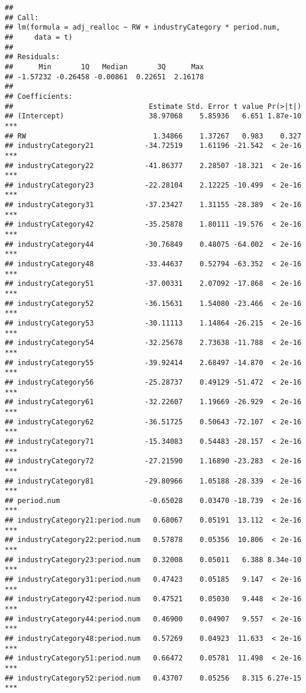 \documentclass[
]{article}
\begin{document}
\begin{verbatim}
## 
## Call:
## lm(formula = adj_realloc ~ RW + industryCategory * period.num, 
##     data = t)
## 
## Residuals:
##      Min       1Q   Median       3Q      Max 
## -1.57232 -0.26458 -0.00861  0.22651  2.16178 
## 
## Coefficients:
##                                Estimate Std. Error t value Pr(>|t|)    
## (Intercept)                    38.97068    5.85936   6.651 1.87e-10 ***
## RW                              1.34866    1.37267   0.983    0.327    
## industryCategory21            -34.72519    1.61196 -21.542  < 2e-16 ***
## industryCategory22            -41.86377    2.28507 -18.321  < 2e-16 ***
## industryCategory23            -22.28104    2.12225 -10.499  < 2e-16 ***
## industryCategory31            -37.23427    1.31155 -28.389  < 2e-16 ***
## industryCategory42            -35.25878    1.80111 -19.576  < 2e-16 ***
## industryCategory44            -30.76849    0.48075 -64.002  < 2e-16 ***
## industryCategory48            -33.44637    0.52794 -63.352  < 2e-16 ***
## industryCategory51            -37.00331    2.07092 -17.868  < 2e-16 ***
## industryCategory52            -36.15631    1.54080 -23.466  < 2e-16 ***
## industryCategory53            -30.11113    1.14864 -26.215  < 2e-16 ***
## industryCategory54            -32.25678    2.73638 -11.788  < 2e-16 ***
## industryCategory55            -39.92414    2.68497 -14.870  < 2e-16 ***
## industryCategory56            -25.28737    0.49129 -51.472  < 2e-16 ***
## industryCategory61            -32.22607    1.19669 -26.929  < 2e-16 ***
## industryCategory62            -36.51725    0.50643 -72.107  < 2e-16 ***
## industryCategory71            -15.34083    0.54483 -28.157  < 2e-16 ***
## industryCategory72            -27.21590    1.16890 -23.283  < 2e-16 ***
## industryCategory81            -29.80966    1.05188 -28.339  < 2e-16 ***
## period.num                     -0.65028    0.03470 -18.739  < 2e-16 ***
## industryCategory21:period.num   0.68067    0.05191  13.112  < 2e-16 ***
## industryCategory22:period.num   0.57878    0.05356  10.806  < 2e-16 ***
## industryCategory23:period.num   0.32008    0.05011   6.388 8.34e-10 ***
## industryCategory31:period.num   0.47423    0.05185   9.147  < 2e-16 ***
## industryCategory42:period.num   0.47521    0.05030   9.448  < 2e-16 ***
## industryCategory44:period.num   0.46900    0.04907   9.557  < 2e-16 ***
## industryCategory48:period.num   0.57269    0.04923  11.633  < 2e-16 ***
## industryCategory51:period.num   0.66472    0.05781  11.498  < 2e-16 ***
## industryCategory52:period.num   0.43707    0.05256   8.315 6.27e-15 ***

\end{verbatim}
\end{document}
